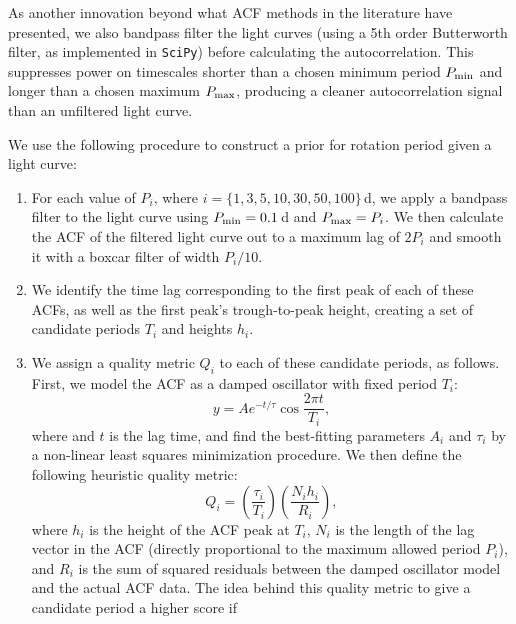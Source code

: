 \documentclass[useAMS, usenatbib, preprint, 12pt]{aastex}
\begin{document}
As another innovation beyond what ACF methods in the literature have
presented, we also bandpass filter the light curves (using a 5th order
Butterworth filter, as implemented in \texttt{SciPy}) before calculating the
autocorrelation.  This suppresses power on timescales shorter than a chosen
minimum period $P_{\rm min}$ and longer than a chosen maximum $P_{\rm max}$,
producing a cleaner autocorrelation signal than an unfiltered light curve.

We use the following procedure to construct a prior for rotation period
given a light curve:

\begin{enumerate}
\item{For each value of $P_i$, where $i = \{1, 3, 5, 10, 30, 50, 100\}$\,d,
we apply a bandpass filter to the light curve using $P_{\rm min}=0.1$\,d
and $P_{\rm max} = P_i$.  We then calculate the ACF of the filtered
light curve out to a maximum lag of $2P_i$ and smooth it with a boxcar
filter of width $P_i/10$.}

\item{We identify the time lag corresponding to the
first peak of each of these ACFs, as well as the first peak's
trough-to-peak height, creating a set of candidate periods
$T_i$ and heights $h_i$.}

\item{We assign a quality metric $Q_i$ to each of these candidate
periods, as follows.  First, we model the ACF as a
damped oscillator with fixed period $T_i$:
\begin{equation}
y = A e^{-t/\tau} \cos{\frac{2\pi t}{T_i} },
\end{equation}
where and $t$ is the lag time,
and find the best-fitting parameters $A_i$ and $\tau_i$ by a non-linear
least squares minimization procedure.  We then define the
following heuristic quality metric:
\begin{equation}
\label{eq:quality}
Q_i = \left(\frac{\tau_i}{T_i}\right) \left(\frac{N_i h_i}{R_i}\right),
\end{equation}
where $h_i$ is the height of the ACF peak at $T_i$,
$N_i$ is the length of the lag vector in the ACF (directly proportional
to the maximum allowed period $P_i$),
and $R_i$ is the sum of squared residuals between the
damped oscillator model and the actual ACF data.  The idea behind this
quality metric to give a candidate period a higher score if

    \begin{enumerate}[(a)]


\end{enumerate}}
\end{enumerate}
\end{document}
